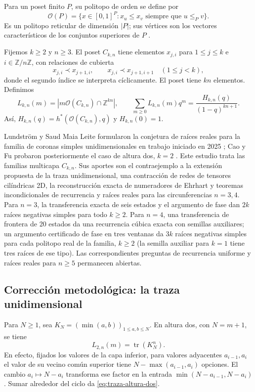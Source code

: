 \documentclass[11pt,a4paper]{article}
\theoremstyle{definition}
\begin{document}
Para un poset finito $P$, su politopo de orden se define por
\[
\mathcal{O}(P)=\{x\in[0,1]^P:x_u\le x_v\text{ siempre que }u\le_P v\}.
\]
Es un politopo reticular de dimensión $|P|$; sus vértices son los vectores característicos de los conjuntos superiores de $P$ \cite{Stanley1986}.

Fijemos $k\ge2$ y $n\ge3$. El poset $C_{k,n}$ tiene elementos $x_{j,i}$ para $1\le j\le k$ e $i\in\mathbb Z/n\mathbb Z$, con relaciones de cubierta
\[
x_{j,i}\prec x_{j+1,i},\qquad x_{j,i}\prec x_{j+1,i+1}\quad (1\le j<k),
\]
donde el segundo índice se interpreta cíclicamente. El poset tiene $kn$ elementos. Definimos
\[
L_{k,n}(m)=|m\mathcal{O}(C_{k,n})\cap\mathbb Z^{kn}|,\qquad
\sum_{m\ge0}L_{k,n}(m)q^m=\frac{H_{k,n}(q)}{(1-q)^{kn+1}}.
\]
Así, $H_{k,n}(q)=h^*(\mathcal{O}(C_{k,n}),q)$ y $H_{k,n}(0)=1$.

Lundström y Saud Maia Leite formularon la conjetura de raíces reales para la familia de coronas simples unidimensionales en trabajo iniciado en 2025 \cite{LundstromLeite2026}; Cao y Fu probaron posteriormente el caso de altura dos, $k=2$ \cite{CaoFu2026}. Este estudio trata las familias multicapa $C_{k,n}$. Sus aportes son el contraejemplo a la extensión propuesta de la traza unidimensional, una contracción de redes de tensores cilíndricas 2D, la reconstrucción exacta de numeradores de Ehrhart y teoremas incondicionales de recurrencia y raíces reales para las circunferencias $n=3,4$. Para $n=3$, la transferencia exacta de seis estados y el argumento de fase dan $2k$ raíces negativas simples para todo $k\ge2$. Para $n=4$, una transferencia de frontera de 20 estados da una recurrencia cúbica exacta con semillas auxiliares; un argumento certificado de fase en tres ventanas da $3k$ raíces negativas simples para cada politopo real de la familia, $k\ge2$ (la semilla auxiliar para $k=1$ tiene tres raíces de ese tipo). Las correspondientes preguntas de recurrencia uniforme y raíces reales para $n\ge5$ permanecen abiertas.

\subsection{Corrección metodológica: la traza unidimensional}

Para $N\ge1$, sea $K_N=(\min(a,b))_{1\le a,b\le N}$. En altura dos, con $N=m+1$, se tiene
\begin{equation}\label{eq:traza-altura-dos}
L_{2,n}(m)=\operatorname{tr}(K_N^n).
\end{equation}
En efecto, fijados los valores de la capa inferior, para valores adyacentes $a_{i-1},a_i$ el valor de su vecino común superior tiene $N-\max(a_{i-1},a_i)$ opciones. El cambio $a_i\mapsto N-a_i$ transforma ese factor en la entrada $\min(N-a_{i-1},N-a_i)$. Sumar alrededor del ciclo da \eqref{eq:traza-altura-dos}.
\end{document}

